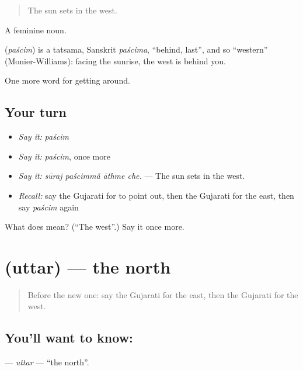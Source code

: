 \begin{quote}
The sun sets in the west.
\end{quote}

A feminine noun.

\begin{cousinweb}
\textbf{} (\emph{paścim}) is a tatsama, Sanskrit \emph{paścima}, \textquotedblleft{}behind, last\textquotedblright{}, and so \textquotedblleft{}western\textquotedblright{} (Monier-Williams): facing the sunrise, the west is behind you.
\end{cousinweb}

\begin{grammarlens}[title={What you've built}]
One more word for getting around.
\end{grammarlens}

\subsection*{Your turn}
\begin{itemize}
\raggedright
  \item \emph{Say it:} \emph{paścim}
  \item \emph{Say it:} \emph{paścim}, once more
  \item \emph{Say it:} \emph{sūraj paścimmā̃ āthme che.} — The sun sets in the west.
  \item \emph{Recall:} say the Gujarati for to point out, then the Gujarati for the east, then say \emph{paścim} again
\end{itemize}

\begin{tcolorbox}[breakable,colback=teal!4,colframe=teal!35!black,title={Before you move on}]
What does  mean? (\textquotedblleft{}The west\textquotedblright{}.) Say it once more.
\end{tcolorbox}
\section[\texorpdfstring{\gu{ઉત્તર} (uttar)}{ઉત્તર (uttar)}]{ (uttar) — the north}

\label{lesson:GU-C414-uttar}



\begin{quote}
Before the new one: say the Gujarati for the east, then the Gujarati for the west.
\end{quote}

\subsection*{You'll want to know: }
\textbf{} — \emph{uttar} — \textquotedblleft{}the north\textquotedblright{}.


